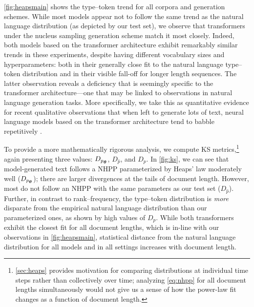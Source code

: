 \documentclass[11pt,a4paper]{article}
\newcommand{\vtheta}{{\boldsymbol \theta}}
\newcommand{\ptheta}{p_{\scaleto{\vtheta}{4pt}}}
\begin{document}
\cref{fig:heapsmain} shows the type--token trend for all corpora and generation schemes. While most models appear not to follow the same trend as the natural language distribution (as depicted by our test set), we observe that transformers under the nucleus sampling generation scheme match it most closely. Indeed, both models based on the transformer architecture exhibit remarkably similar trends in these experiments, despite having different vocabulary sizes and hyperparameters: both in their generally close fit to the natural language type--token distribution and in their visible fall-off for longer length sequences. The latter observation reveals a deficiency that is seemingly specific to the transformer architecture---one that may be linked to observations in natural language generation tasks. More specifically, we take this as quantitative evidence for recent qualitative observations that  when left to generate lots of text, neural language models based on the transformer architecture tend to babble repetitively \cite{holtzman2019curious, pmlr-v97-cohen19a, eikema2020map}.


To provide a more mathematically rigorous analysis, we compute KS metrics,\footnote{ \cref{sec:heaps} provides motivation for comparing distributions at individual time steps rather than collectively over time; analyzing \cref{eq:nhpp} for all document lengths simultaneously would not give us a sense of how the power-law fit changes as a function of document length.} again presenting three values: $D_{\ptheta}$, $D_{\hat p}$, and $D_{p}$. In \cref{fig:ks}, we can see that model-generated text follows a NHPP parameterized by Heaps' law moderately well ($D_{\ptheta}$); there are larger divergences at the tails of document length. However, most do not follow an NHPP with the same parameters as our test set ($D_{\hat p}$). Further, in contrast to rank--frequency, the type--token distribution is \emph{more} disparate from the empirical natural language distribution than our parameterized ones, as shown by high values of $D_p$. While both transformers exhibit the closest fit for all document lengths, which is in-line with our observations in \cref{fig:heapsmain}, statistical distance from the natural language distribution for all models and in all settings increases with document length.
\end{document}
